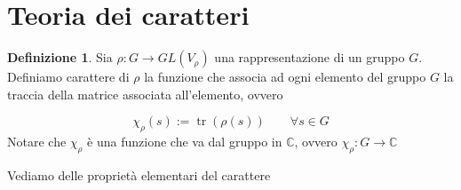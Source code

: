 \documentclass[11pt]{article}
\theoremstyle{plain}
\theoremstyle{definition}
\newtheorem{defn}{Definizione}[section]
\theoremstyle{remark}
\newcommand{\C}{\mathbb{C}}
\DeclareMathOperator{\tr}{tr}
\begin{document}
\newpage
\section{Teoria dei caratteri}


\begin{defn}
Sia $\rho: G \to GL(V_\rho)$ una rappresentazione di un gruppo $G$. Definiamo carattere di $\rho$ la funzione che associa ad ogni elemento del gruppo $G$ la traccia della matrice associata all'elemento, ovvero

\[\chi_\rho(s) := \tr(\rho(s)) \qquad \forall s \in G \]
Notare che $\chi_{\rho}$ è una funzione che va dal gruppo in $\C$, ovvero $\chi_{\rho}: G \to \C$

\end{defn}

Vediamo delle proprietà elementari del carattere
\end{document}

